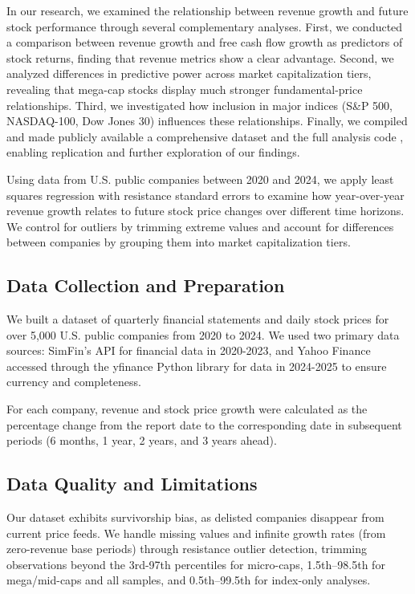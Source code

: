 \documentclass[11pt]{article}
\begin{document}
In our research, we examined the relationship between revenue growth and future stock performance through several complementary analyses. First, we conducted a comparison between revenue growth and free cash flow growth as predictors of stock returns, finding that revenue metrics show a clear advantage. Second, we analyzed differences in predictive power across market capitalization tiers, revealing that mega-cap stocks display much stronger fundamental-price relationships. Third, we investigated how inclusion in major indices (S\&P 500, NASDAQ-100, Dow Jones 30) influences these relationships. Finally, we compiled and made publicly available a comprehensive dataset \citep{cash-time-machine-dataset} and the full analysis code \citep{cash-time-machine-code}, enabling replication and further exploration of our findings.

Using data from U.S. public companies between 2020 and 2024, we apply least squares regression with resistance standard errors to examine how year-over-year revenue growth relates to future stock price changes over different time horizons. We control for outliers by trimming extreme values and account for differences between companies by grouping them into market capitalization tiers.

\subsection{Data Collection and Preparation}

We built a dataset of quarterly financial statements and daily stock prices for over 5,000 U.S. public companies from 2020 to 2024. We used two primary data sources: SimFin's API \citep{simfin} for financial data in 2020-2023, and Yahoo Finance accessed through the yfinance Python library \citep{yfinance} for data in 2024-2025 to ensure currency and completeness.

For each company, revenue and stock price growth were calculated as the percentage change from the report date to the corresponding date in subsequent periods (6 months, 1 year, 2 years, and 3 years ahead).

\subsection{Data Quality and Limitations} 

Our dataset exhibits survivorship bias, as delisted companies disappear from current price feeds. We handle missing values and infinite growth rates (from zero-revenue base periods) through resistance outlier detection, trimming observations beyond the 3rd-97th percentiles for micro-caps, 1.5th–98.5th for mega/mid-caps and all samples, and 0.5th–99.5th for index-only analyses.
\end{document}
